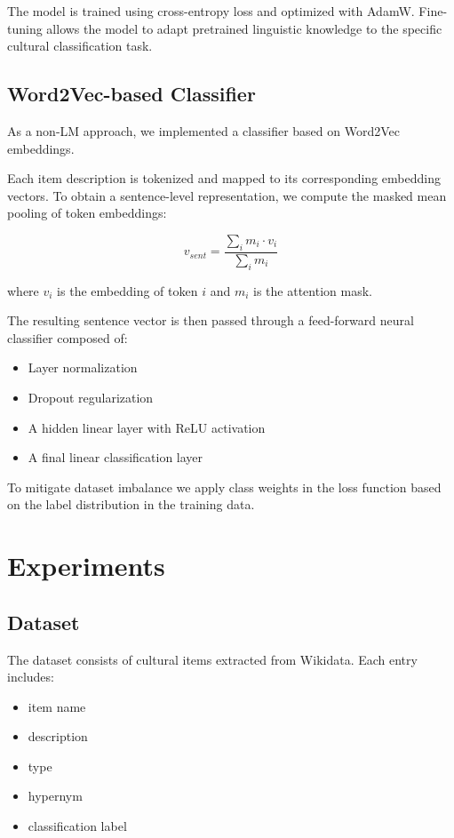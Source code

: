 \documentclass[11pt]{article}
\begin{document}
The model is trained using cross-entropy loss and optimized with AdamW. Fine-tuning allows the model to adapt pretrained linguistic knowledge to the specific cultural classification task.

\subsection{Word2Vec-based Classifier}

As a non-LM approach, we implemented a classifier based on Word2Vec embeddings.

Each item description is tokenized and mapped to its corresponding embedding vectors. To obtain a sentence-level representation, we compute the masked mean pooling of token embeddings:

\begin{equation}
v_{sent} = \frac{\sum_i m_i \cdot v_i}{\sum_i m_i}
\end{equation}

where $v_i$ is the embedding of token $i$ and $m_i$ is the attention mask.

The resulting sentence vector is then passed through a feed-forward neural classifier composed of:
\begin{itemize}
\item Layer normalization
\item Dropout regularization
\item A hidden linear layer with ReLU activation
\item A final linear classification layer
\end{itemize}

To mitigate dataset imbalance we apply class weights in the loss function based on the label distribution in the training data.

\section{Experiments}

\subsection{Dataset}

The dataset consists of cultural items extracted from Wikidata. Each entry includes:

\begin{itemize}
\item item name
\item description
\item type
\item hypernym
\item classification label
\end{itemize}
\end{document}
